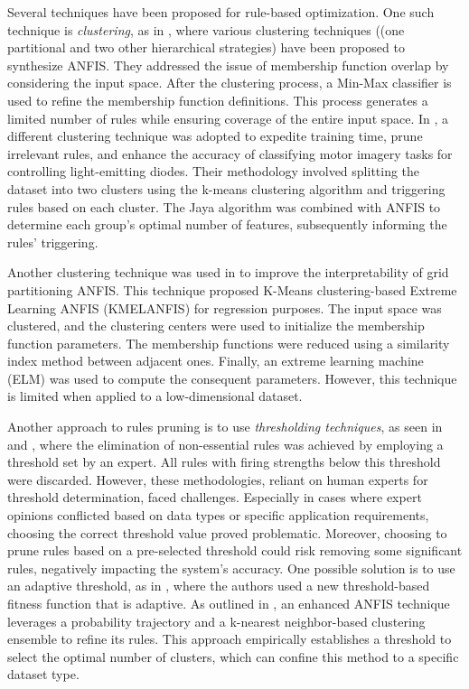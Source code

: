 Several techniques have been proposed for rule-based optimization. One such technique is \textit{clustering}, as in \cite{leonori2020generalized}, where various clustering techniques ((one partitional and two other hierarchical strategies) have been proposed to synthesize ANFIS. They addressed the issue of membership function overlap by considering the input space. After the clustering process, a Min-Max classifier is used to refine the membership function definitions. This process generates a limited number of rules while ensuring coverage of the entire input space.
In \cite{suraj2016jaya}, a different clustering technique was adopted to expedite training time, prune irrelevant rules, and enhance the accuracy of classifying motor imagery tasks for controlling light-emitting diodes. Their methodology involved splitting the dataset into two clusters using the k-means clustering algorithm and triggering rules based on each cluster. The Jaya algorithm was combined with ANFIS to determine each group's optimal number of features, subsequently informing the rules' triggering.

Another clustering technique was used in \cite{pramod2021k} to improve the interpretability of grid partitioning ANFIS. This technique proposed K-Means clustering-based Extreme Learning ANFIS (KMELANFIS) for regression purposes. The input space was clustered, and the clustering centers were used to initialize the membership function parameters. The membership functions were reduced using a similarity index method between adjacent ones. Finally, an extreme learning machine (ELM) was used to compute the consequent parameters. However, this technique is limited when applied to a low-dimensional dataset. 

Another approach to rules pruning is to use \textit{thresholding techniques}, as seen in \cite{rini2013balanced} and  \cite{wang2012assessment}, where the elimination of non-essential rules was achieved by employing a threshold set by an expert. All rules with firing strengths below this threshold were discarded. However, these methodologies, reliant on human experts for threshold determination, faced challenges. Especially in cases where expert opinions conflicted based on data types or specific application requirements, choosing the correct threshold value proved problematic. Moreover, choosing to prune rules based on a pre-selected threshold could risk removing some significant rules, negatively impacting the system's accuracy. One possible solution is to use an adaptive threshold, as in \cite{guendouzi2021new}, where the authors used a new threshold-based fitness function that is adaptive.
As outlined in \cite{owoseni2020improved}, an enhanced ANFIS technique leverages a probability trajectory and a k-nearest neighbor-based clustering ensemble to refine its rules. This approach empirically establishes a threshold to select the optimal number of clusters, which can confine this method to a specific dataset type.

